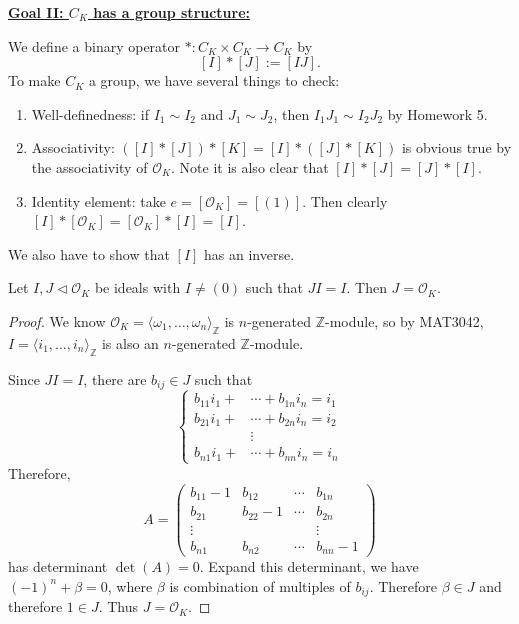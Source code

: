 \noindent \underline{\bf Goal II: $C_{K}$ has a group structure:} 

We define a binary operator $*:C_{K}\times C_{K}\to C_{K}$ by 
    \[ 
    [I]*[J]:=[IJ].
    \]
To make $C_{K}$ a group, we have several things to check: 
\begin{enumerate}
    \item Well-definedness: if $I_{1}\sim I_{2}$ and $J_{1}\sim J_{2}$, then $I_{1}J_{1}\sim I_{2}J_{2}$ by Homework 5. 
    \item Associativity: $([I]*[J])*[K]=[I]*([J]*[K])$ is obvious true by the associativity of $\mathcal{O}_{K}$. Note it is also clear that $[I]*[J]=[J]*[I]$. 
    \item Identity element: take $e=[\mathcal{O}_{K}]=[(1)]$. Then clearly $[I]*[\mathcal{O}_{K}]=[\mathcal{O}_{K}]*[I]=[I]$. 
\end{enumerate}

We also have to show that $[I]$ has an inverse. 

\begin{lemma}\label{lem-idealCancelation}
    Let $I,J\lhd \mathcal{O}_{K}$ be ideals with $I\neq(0)$ such that $JI=I$. Then $J=\mathcal{O}_{K}$. 
\end{lemma}

\begin{proof}
    We know $\mathcal{O}_{K}=\langle \omega_{1},\dots, \omega_{n}\rangle_{\mathbb{Z}}$ is $n$-generated $\mathbb{Z}$-module, so by MAT3042, $I=\langle i_{1},\dots,i_{n}\rangle_{\mathbb{Z}}$ is also an $n$-generated $\mathbb{Z}$-module. 
    
    Since $JI=I$, there are $b_{ij}\in J$ such that 
    \[
    \left\{
        \begin{aligned}
            b_{11}i_{1}+&\cdots+b_{1n}i_{n}=i_{1}\\
            b_{21}i_{1}+&\cdots+b_{2n}i_{n}=i_{2}\\
            &\vdots\\
            b_{n1}i_{1}+&\cdots+b_{nn}i_{n}=i_{n}
        \end{aligned}
    \right.
    \]
    Therefore, 
    \[
    A=\begin{pmatrix}
        b_{11}-1& b_{12}&\cdots & b_{1n}\\
        b_{21}&b_{22}-1&\cdots & b_{2n}\\
        \vdots& &&\vdots\\
        b_{n1}&b_{n2}&\cdots &b_{nn}-1
    \end{pmatrix}
    \]
    has determinant $\det (A)=0$. Expand this determinant, we have $(-1)^{n}+\beta=0$, where $\beta$ is combination of multiples of $b_{ij}$. Therefore $\beta\in J$ and therefore $1\in J$. Thus $J=\mathcal{O}_{K}$. 
\end{proof}

